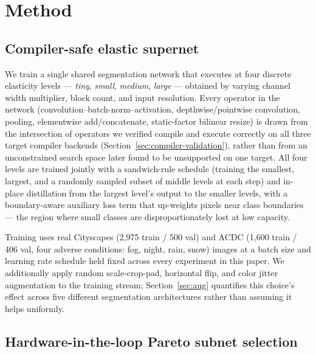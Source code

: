 \documentclass[a4paper,review,12pt]{elsarticle}
\begin{document}
\section{Method}
\label{sec:method}

\subsection{Compiler-safe elastic supernet}
\label{sec:supernet}

We train a single shared segmentation network that executes at four discrete
elasticity levels --- \emph{tiny}, \emph{small}, \emph{medium}, \emph{large}
--- obtained by varying channel width multiplier, block count, and input
resolution. Every operator in the network (convolution--batch-norm--activation,
depthwise/pointwise convolution, pooling, elementwise add/concatenate,
static-factor bilinear resize) is drawn from the intersection of operators we
verified compile and execute correctly on all three target compiler backends
(Section~\ref{sec:compiler-validation}), rather than from an unconstrained
search space later found to be unsupported on one target. All four levels are
trained jointly with a sandwich-rule schedule (training the smallest, largest,
and a randomly sampled subset of middle levels at each step) and in-place
distillation from the largest level's output to the smaller levels, with a
boundary-aware auxiliary loss term that up-weights pixels near class
boundaries --- the region where small classes are disproportionately lost at
low capacity.

Training uses real Cityscapes (2{,}975 train / 500 val) and ACDC (1{,}600
train / 406 val, four adverse conditions: fog, night, rain, snow) images at a
batch size and learning rate schedule held fixed across every experiment in
this paper. We additionally apply random scale-crop-pad, horizontal flip, and
color jitter augmentation to the training stream; Section~\ref{sec:aug}
quantifies this choice's effect across five different segmentation
architectures rather than assuming it helps uniformly.

\subsection{Hardware-in-the-loop Pareto subnet selection}
\label{sec:pareto}
\end{document}
